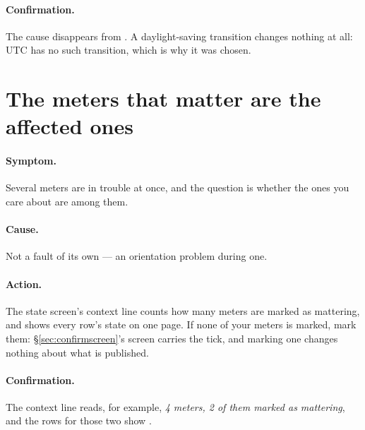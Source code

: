 \paragraph{Confirmation.} The cause disappears from . A daylight-saving
transition changes nothing at all: UTC has no such transition, which is why it was chosen.

\section{The meters that matter are the affected ones}
\label{sec:trouble-priority}

\paragraph{Symptom.} Several meters are in trouble at once, and the question is whether the
ones you care about are among them.

\paragraph{Cause.} Not a fault of its own --- an orientation problem during one.

\paragraph{Action.} The state screen's context line counts how many meters are marked as
mattering, and  shows every row's state on one page. If none of your meters is
marked, mark them: \S\ref{sec:confirmscreen}'s screen carries the tick, and marking one
changes nothing about what is published.

\paragraph{Confirmation.} The context line reads, for example, \emph{4 meters, 2 of them
marked as mattering}, and the rows for those two show .
